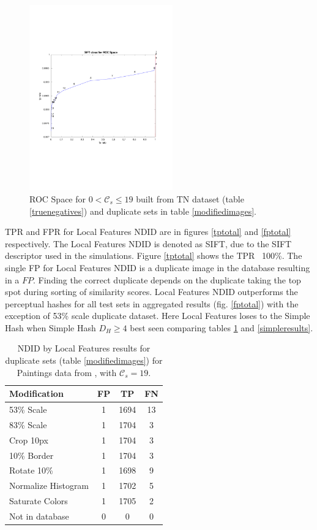 \documentclass[english,12pt,a4paper,pdftex,elec,utf8]{aaltothesis}
\begin{document}
\begin{figure}[htb]
\begin{center}
\includegraphics[height=8cm]{figures/SIFTROCperCutoff}
\end{center}
\caption{ ROC Space for $0 < \mathcal{C}_{s} \leq 19$ built from TN dataset (table \ref{truenegatives}) and duplicate sets in table \ref{modifiedimages}.}
\label{figcutoffrocspace}
\end{figure}

TPR and FPR for Local Features NDID are in figures \ref{tptotal} and \ref{fptotal} respectively. The Local Features NDID is denoted as SIFT, due to the SIFT descriptor used in the simulations. Figure \ref{tptotal} shows the TPR ~100\%. The single FP for Local Features NDID is a duplicate image in the database resulting in a $FP$. Finding the correct duplicate depends on the duplicate taking the top spot during sorting of similarity scores. Local Features NDID outperforms the perceptual hashes for all test sets in aggregated results (fig. \ref{fptotal}) with the exception of 53\% scale duplicate dataset. Here Local Features loses to the Simple Hash when Simple Hash $D_H \geq 4 $ best seen comparing tables \ref{siftresults} and \ref{simpleresults}.

\begin{table}
\caption{ NDID by Local Features results for duplicate sets (table \ref{modifiedimages}) for Paintings data from \cite{Vedaldi2012}, with $\mathcal{C}_s = 19$.}
\label{siftresults}
\begin{center}
  \begin{tabular}{@{}lccc@{}}
    \toprule
    Modification & FP & TP & FN\\
    \hline
    53\% Scale & 1 & 1694 & 13 \\
    83\% Scale & 1 & 1704 & 3 \\
    Crop 10px  & 1 & 1704 & 3 \\
    10\% Border & 1 & 1704 & 3 \\
    Rotate 10\% & 1 & 1698 & 9\\
    Normalize Histogram & 1 & 1702 & 5\\
    Saturate Colors & 1 & 1705 & 2\\
    Not in database & 0 & 0 & 0\\
    \bottomrule
\end{tabular}
\end{center}
\end{table}
\end{document}
